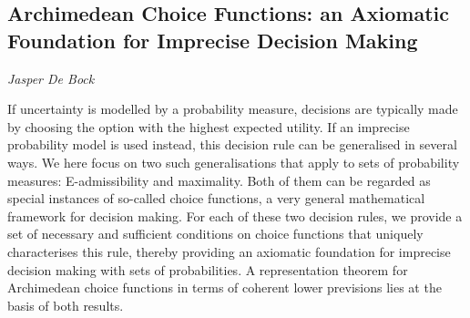 \documentclass[../booklet.tex]{subfiles}
\begin{document}
\subsection[Archimedean Choice Functions: an Axiomatic Foundation for Imprecise Decision Making. {\it Jasper De Bock}]{Archimedean Choice Functions: an Axiomatic Foundation for Imprecise Decision Making}

\begin{center}
  {\it Jasper De Bock}
\end{center}

\vskip 0.8cm


If uncertainty is modelled by a probability measure, decisions are typically made by choosing the option with the highest expected utility. If an imprecise probability model is used instead, this decision rule can be generalised in several ways. We here focus on two such generalisations that apply to sets of probability measures: E-admissibility and maximality. Both of them can be regarded as special instances of so-called choice functions, a very general mathematical framework for decision making. For each of these two decision rules, we provide a set of necessary and sufficient conditions on choice functions that uniquely characterises this rule, thereby providing an axiomatic foundation for imprecise decision making with sets of probabilities. A representation theorem for Archimedean choice functions in terms of coherent lower previsions lies at the basis of both results.

\end{document}
